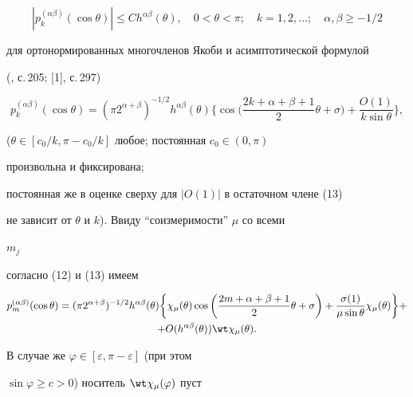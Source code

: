 \begin{equation} 


|p^{(\alpha\beta)}_k(\cos\theta)|\le C h^{\alpha\beta}(\theta), 


\quad 0<\theta<\pi;\quad k=1,2,\dotsc;\quad 


\alpha,\beta\ge-1/2


\end{equation} 


для ортонормированных многочленов Якоби и асимптотической формулой 


(\cite{3}, с.\,205; [1], с.\,297) 


\begin{equation} 


p^{(\alpha\beta)}_k(\cos\theta)=(\pi 2^{\alpha+\beta})^{-1/2} 


h^{\alpha\beta}(\theta)\bigg\{\cos\bigg( 


\frac{2k+\alpha+\beta+1}{2}\theta+\sigma\bigg)+ 


\frac{O(1)}{k\sin\theta}\bigg\}, 


\end{equation} 


($\theta\in[c_0/k,\pi-c_0/k]$ любое; постоянная $c_0\in(0,\pi)$ 


произвольна и фиксирована; 


постоянная же в оценке сверху для $|O(1)|$ в остаточном члене (13) 


не зависит от $\theta$ и $k$). Ввиду ``соизмеримости'' $\mu$ со всеми 


$m_j$ 


согласно (12) и (13) имеем 


\begin{multline} 


p^{(\alpha\beta)}_m(\cos\theta)=(\pi 2^{\alpha+\beta})^{-1/2} 


h^{\alpha\beta}(\theta)\bigg\{\chi_\mu(\theta)\cos\bigg( 


\frac{2m+\alpha+\beta+1}{2}\theta+\sigma\bigg)+ 


\frac{\sigma(1)}{\mu\sin\theta}\chi_\mu(\theta)\bigg\}+ \\


+ O(h^{\alpha\beta}(\theta))\wt\chi_\mu(\theta). 


\end{multline} 


В случае же $\varphi\in[\varepsilon,\pi-\varepsilon]$ (при этом 


$\sin\varphi\ge c>0$) носитель $\wt\chi_\mu(\varphi)$ пуст 



